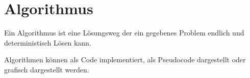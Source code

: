 \documentclass{article}
\begin{document}
\section{Algorithmus} 
Ein Algorithmus ist eine Lösungsweg der ein gegebenes Problem endlich und deterministisch Lösen kann.

Algorithmen können als Code implementiert, als Pseudocode dargestellt oder grafisch dargestellt werden.
\end{document}
